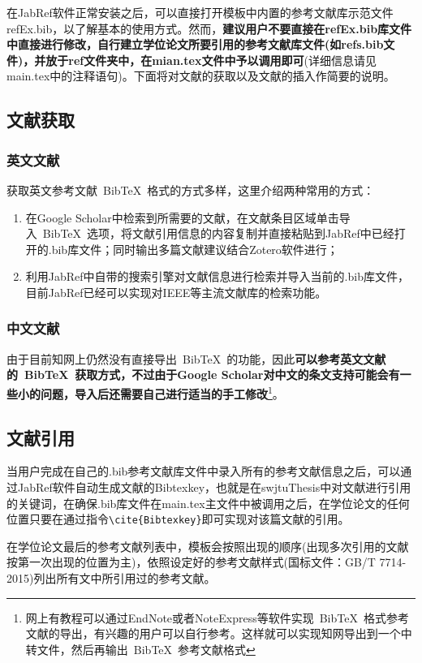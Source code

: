 \par
在JabRef软件正常安装之后，可以直接打开模板中内置的参考文献库示范文件refEx.bib，以了解基本的使用方式。然而，\textbf{建议用户不要直接在refEx.bib库文件中直接进行修改，自行建立学位论文所要引用的参考文献库文件(如refs.bib文件)，并放于ref文件夹中，在mian.tex文件中予以调用即可}(详细信息请见main.tex中的注释语句)。下面将对文献的获取以及文献的插入作简要的说明。

\subsection{文献获取}
\subsubsection{英文文献}
获取英文参考文献~BibTeX{}~格式的方式多样，这里介绍两种常用的方式：
\par
\begin{enumerate}
  \item 在Google Scholar中检索到所需要的文献，在文献条目区域单击导入~BibTeX{}~选项，将文献引用信息的内容复制并直接粘贴到JabRef中已经打开的.bib库文件；同时输出多篇文献建议结合Zotero软件进行；
  \item 利用JabRef中自带的搜索引擎对文献信息进行检索并导入当前的.bib库文件，目前JabRef已经可以实现对IEEE等主流文献库的检索功能。
\end{enumerate}

\subsubsection{中文文献}
由于目前知网上仍然没有直接导出~BibTeX{}~的功能，因此\textbf{可以参考英文文献的~BibTeX{}~获取方式，不过由于Google Scholar对中文的条文支持可能会有一些小的问题，导入后还需要自己进行适当的手工修改}\footnote{网上有教程可以通过EndNote或者NoteExpress等软件实现~BibTeX{}~格式参考文献的导出，有兴趣的用户可以自行参考。这样就可以实现知网导出到一个中转文件，然后再输出~BibTeX{}~参考文献格式}。

\subsection{文献引用}
当用户完成在自己的.bib参考文献库文件中录入所有的参考文献信息之后，可以通过JabRef软件自动生成文献的Bibtexkey，也就是在swjtuThesis中对文献进行引用的关键词，在确保.bib库文件在main.tex主文件中被调用之后，在学位论文的任何位置只要在通过指令\verb|\cite{Bibtexkey}|即可实现对该篇文献的引用。

\par
在学位论文最后的参考文献列表中，模板会按照出现的顺序(出现多次引用的文献按第一次出现的位置为主)，依照设定好的参考文献样式(国标文件：GB/T 7714-2015)列出所有文中所引用过的参考文献。

